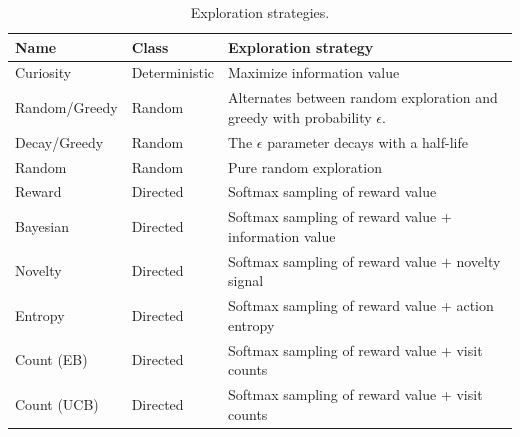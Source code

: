 \begin{table}[]
	\caption{Exploration strategies.}
	\label{tab:agents}
	\begin{tabular}{|p{2cm}|p{2cm}|p{3cm}|}
	\hline
	\textbf{Name} & \textbf{Class} & \textbf{Exploration strategy} \\ \hline
	Curiosity & Deterministic & Maximize information value \\ \hline
	Random/Greedy & Random & Alternates between random exploration and greedy with probability $\epsilon$. \\ \hline
	Decay/Greedy & Random & The $\epsilon$ parameter decays with a half-life \\ \hline
	Random & Random & Pure random exploration \\ \hline
	Reward & Directed & Softmax sampling of reward value \\ \hline
	Bayesian & Directed & Softmax sampling of reward value + information value \\ \hline
	Novelty & Directed & Softmax sampling of reward value + novelty signal \\ \hline
	Entropy & Directed & Softmax sampling of reward value + action entropy \\ \hline
	Count (EB) & Directed & Softmax sampling of reward value + visit counts \\ \hline
	Count (UCB) & Directed & Softmax sampling of reward value + visit counts \\ \hline
	\end{tabular}
\end{table}

